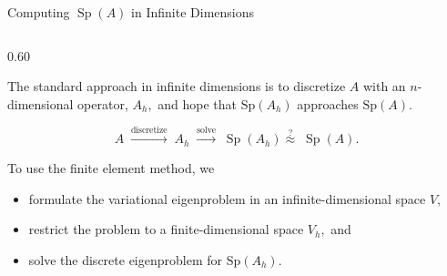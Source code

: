 \documentclass[aspectratio=169]{beamer}
\begin{document}


\begin{frame}{Computing \(\operatorname{Sp}(A)\) in Infinite Dimensions}

\begin{columns}[T,onlytextwidth]

\begin{column}{0.60\textwidth}

The standard approach in infinite dimensions is to discretize $A$ with an $n$-dimensional operator, $A_h,$ and hope that $\text{Sp}(A_h)$ approaches $\text{Sp}(A).$


\vspace{0.2cm}

\[
A
\;\xrightarrow{\text{discretize}}\;
A_h
\;\xrightarrow{\text{solve}}\;
\operatorname{Sp}(A_h)
\stackrel{?}{\approx}\;
\operatorname{Sp}(A).
\]

\vspace{0.3cm}

To use the finite element method, we
\begin{itemize}
    \item formulate the variational eigenproblem in an infinite-dimensional space \(V\),
    \item restrict the problem to a finite-dimensional space $V_h,$ and
    \item solve the discrete eigenproblem for $\text{Sp}(A_h).$
\end{itemize}


\end{column}
\end{columns}
\end{frame}
\end{document}
